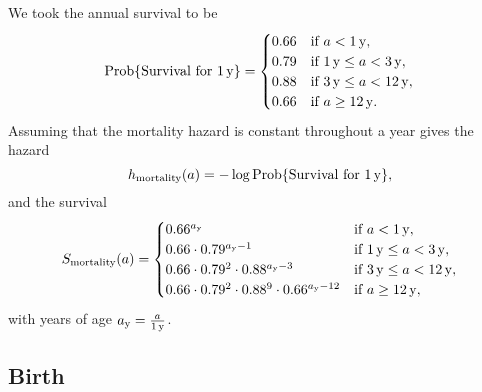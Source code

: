 \documentclass[12pt, UKenglish]{article}  %
\DeclareMathOperator{\Prob}{Prob}
\begin{document}
We took the annual survival to be
\begin{equation}
  \Prob\{\text{Survival for $\unit[1]{y}$}\}
  =
  \begin{cases}
    0.66 & \text{if $a < \unit[1]{y}$},
    \\
    0.79 & \text{if $\unit[1]{y} \leq a < \unit[3]{y}$},
    \\
    0.88 & \text{if $\unit[3]{y} \leq a < \unit[12]{y}$},
    \\
    0.66 & \text{if $a \geq \unit[12]{y}$}.
  \end{cases}
\end{equation}
Assuming that the mortality hazard is constant throughout a year gives
the hazard
\begin{equation}
  h_{\text{mortality}}(a)
  = - \log \Prob\{\text{Survival for $\unit[1]{y}$}\},
\end{equation}
and the survival
\begin{equation}
  \begin{split}
    S_{\text{mortality}}(a)
    =
    \begin{cases}
      0.66^{a_{\mathrm{y}}}
      & \text{if $a < \unit[1]{y}$},
      \\
      0.66 \cdot 0.79^{a_{\mathrm{y}} - 1}
      & \text{if $\unit[1]{y} \leq a < \unit[3]{y}$},
      \\
      0.66 \cdot 0.79^2 \cdot 0.88^{a_{\mathrm{y}} - 3}
      & \text{if $\unit[3]{y} \leq a < \unit[12]{y}$},
      \\
      0.66 \cdot 0.79^2 \cdot 0.88^9 \cdot 0.66^{a_{\mathrm{y}} - 12}
      & \text{if $a \geq \unit[12]{y}$},
    \end{cases}
  \end{split}
\end{equation}
with years of age $a_{\mathrm{y}} = \frac{a}{\unit[1]{y}}$.

\subsection{Birth}
\end{document}
